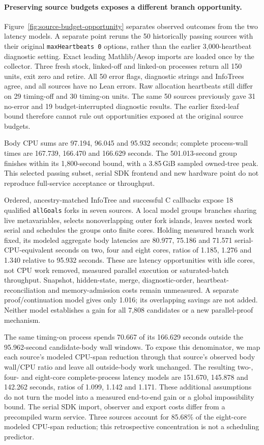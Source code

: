 \documentclass[10pt,twocolumn]{article}
\begin{document}
\paragraph{Preserving source budgets exposes a different branch opportunity.}
Figure~\ref{fig:source-budget-opportunity} separates observed outcomes
from the two latency models.
A separate point reruns the 50 historically passing sources with their
original \texttt{maxHeartbeats 0} options, rather than the earlier 3,000-heartbeat
diagnostic setting. Exact leading Mathlib/Aesop imports are loaded once by
the collector. Three fresh stock, linked-off and linked-on processes return
all 150 units, exit zero and retire. All 50 error flags, diagnostic strings
and InfoTrees agree, and all sources have no Lean errors. Raw allocation
heartbeats still differ on 29 timing-off and 30 timing-on units.
The same 50 sources previously gave 31 no-error and 19 budget-interrupted
diagnostic results. The earlier fixed-leaf bound therefore cannot rule out
opportunities exposed at the original source budgets.

Body CPU sums are 97.194, 96.045 and 95.932 seconds; complete process-wall
times are 167.739, 166.470 and 166.629 seconds. The 501.013-second group
finishes within its 1,800-second bound, with a 3.85\,GiB sampled owned-tree
peak. This selected passing subset, serial SDK frontend and new hardware
point do not reproduce full-service acceptance or throughput.

Ordered, ancestry-matched InfoTree and successful C callbacks expose 18
qualified \texttt{allGoals} forks in seven sources. A local model groups
branches sharing live metavariables, selects nonoverlapping outer fork
islands, leaves nested work serial and schedules the groups onto finite
cores. Holding measured branch work fixed, its modeled aggregate body
latencies are 80.977, 75.186 and 71.571 serial-CPU-equivalent seconds on
two, four and eight cores, ratios of 1.185, 1.276 and 1.340 relative to
95.932 seconds. These are latency opportunities with idle cores, not CPU
work removed, measured parallel execution or saturated-batch throughput.
Snapshot, hidden-state, merge, diagnostic-order, heartbeat-reconciliation
and memory-admission costs remain unmeasured. A separate proof/continuation
model gives only 1.016; its overlapping savings are not added.
Neither model establishes a gain for all 7,808 candidates or a new
parallel-proof mechanism.

The same timing-on process spends 70.667 of its 166.629 seconds outside
the 95.962-second candidate-body wall windows. To expose this denominator,
we map each source's modeled CPU-span reduction through that source's
observed body wall/CPU ratio and leave all outside-body work unchanged.
The resulting two-, four- and eight-core complete-process latency models
are 151.670, 145.878 and 142.262 seconds, ratios of 1.099, 1.142 and 1.171.
These additional assumptions do not turn the model into a measured
end-to-end gain or a global impossibility bound. The serial SDK import,
observer and export costs differ from a precompiled warm service.
Three sources account for 85.68\% of the eight-core modeled CPU-span
reduction; this retrospective concentration is not a scheduling predictor.
\end{document}
